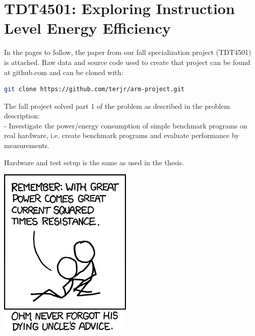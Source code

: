 \documentclass{MScthesisITEM}
\begin{document}
\chapter{TDT4501: Exploring Instruction Level Energy Efficiency}
\label{RH13}
In the pages to follow, the paper from our fall specialization project (TDT4501)
is attached. Raw data and source code used to create that project can be found at github.com
and can be cloned with:
\begin{lstlisting}[language=bash,numbers=none]
git clone https://github.com/terjr/arm-project.git
\end{lstlisting}

\noindent The fall project solved part 1 of the problem as described in the problem description:\hfill\\
\indent - Investigate the power/energy
consumption of simple benchmark programs on real hardware, i.e. create benchmark
programs and evaluate performance by measurements.

Hardware and test setup is the same as used in the thesis.

\vfill
\newpage



\newpage
\thispagestyle{empty}
\vfill
\newpage
\thispagestyle{empty}
\centering
\includegraphics{figs/ohm.png}
\vfill
\end{document}

